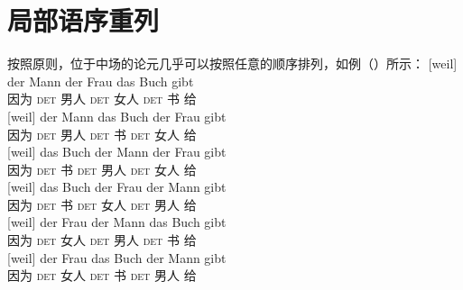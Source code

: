 \section{局部语序重列}
\label{sec-GB-lokale-Umstellung}

按照原则，位于中场的论元几乎可以按照任意的顺序排列，如例（）所示：
\eal
\label{ex-gb-umstellung}
\ex 
\gll {}[weil] der Mann der Frau das Buch gibt\\
     \spacebr{}因为 \textsc{det} 男人 \textsc{det} 女人 \textsc{det} 书 给\\
\ex 
\gll {}[weil] der Mann das Buch der Frau gibt\\
     \spacebr{}因为 \textsc{det} 男人 \textsc{det} 书 \textsc{det} 女人 给\\
\ex\label{ex-das-buch-der-mann-der-frau-gibt} 
\gll {}[weil] das Buch der Mann der Frau gibt\\
     \spacebr{}因为 \textsc{det} 书 \textsc{det} 男人 \textsc{det} 女人 给\\
\ex 
\gll {}[weil] das Buch der Frau der Mann gibt\\
     \spacebr{}因为 \textsc{det} 书 \textsc{det} 女人 \textsc{det} 男人 给\\
\ex 
\gll {}[weil] der Frau der Mann das Buch gibt\\
     \spacebr{}因为 \textsc{det} 女人 \textsc{det} 男人 \textsc{det} 书 给\\
\ex 
\gll {}[weil] der Frau das Buch der Mann gibt\\
     \spacebr{}因为 \textsc{det} 女人 \textsc{det} 书 \textsc{det} 男人 给\\
\zl

